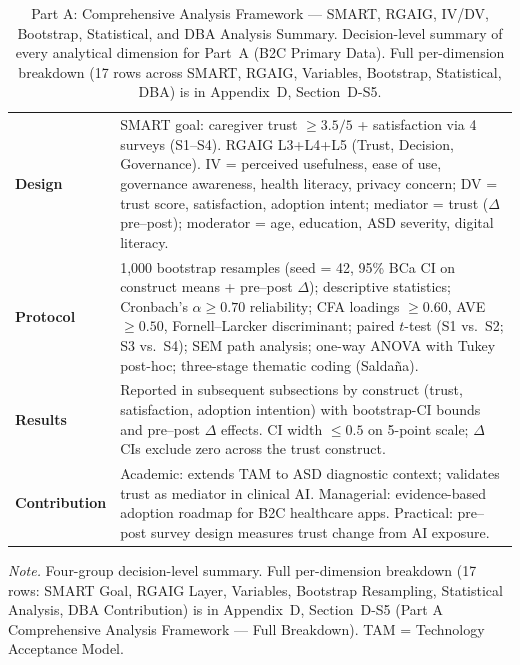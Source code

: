 {\tablestripes\tablefontsize
{}
\begin{xltabular}{\textwidth}{@{} >{\raggedright\arraybackslash}p{2.5cm} L @{}}
\caption[Part A: Comprehensive Analysis Framework --- SMART,]{Part A: Comprehensive Analysis Framework --- SMART, RGAIG, IV/DV, Bootstrap, Statistical, and DBA Analysis Summary. Decision-level summary of every analytical dimension for Part~A (B2C Primary Data). Full per-dimension breakdown (17 rows across SMART, RGAIG, Variables, Bootstrap, Statistical, DBA) is in Appendix~D, Section~D-S5.}\label{tab:ch4_parta_comprehensive} \\
\toprule
{} &  \\
\midrule
\endfirsthead
\endhead
\bottomrule
\endlastfoot
\textbf{Design} & SMART goal: caregiver trust $\geq 3.5/5$ + satisfaction via 4 surveys (S1--S4). RGAIG L3+L4+L5 (Trust, Decision, Governance). IV = perceived usefulness, ease of use, governance awareness, health literacy, privacy concern; DV = trust score, satisfaction, adoption intent; mediator = trust ($\Delta$ pre--post); moderator = age, education, ASD severity, digital literacy. \\
\addlinespace
\textbf{Protocol} & 1,000 bootstrap resamples (seed = 42, 95\% BCa CI on construct means + pre--post $\Delta$); descriptive statistics; Cronbach's $\alpha \geq 0.70$ reliability; CFA loadings $\geq 0.60$, AVE $\geq 0.50$, Fornell--Larcker discriminant; paired $t$-test (S1 vs.\ S2; S3 vs.\ S4); SEM path analysis; one-way ANOVA with Tukey post-hoc; three-stage thematic coding (Salda\~{n}a). \\
\addlinespace
\textbf{Results} & Reported in subsequent subsections by construct (trust, satisfaction, adoption intention) with bootstrap-CI bounds and pre--post $\Delta$ effects. CI width $\leq 0.5$ on 5-point scale; $\Delta$ CIs exclude zero across the trust construct. \\
\addlinespace
\textbf{Contribution} & Academic: extends TAM to ASD diagnostic context; validates trust as mediator in clinical AI. Managerial: evidence-based adoption roadmap for B2C healthcare apps. Practical: pre--post survey design measures trust change from AI exposure. \\
\end{xltabular}}
\vspace{0.4em}
\noindent\textit{Note.} Four-group decision-level summary. Full per-dimension breakdown (17 rows: SMART Goal, RGAIG Layer, Variables, Bootstrap Resampling, Statistical Analysis, DBA Contribution) is in Appendix~D, Section~D-S5 (Part A Comprehensive Analysis Framework --- Full Breakdown). TAM = Technology Acceptance Model.

